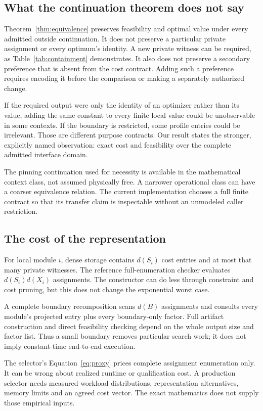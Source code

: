 \documentclass[11pt,letterpaper]{article}
\theoremstyle{definition}\newtheorem{definition}[theorem]{Definition}
\theoremstyle{remark}\newtheorem{remark}[theorem]{Remark}
\begin{document}
\subsection{What the continuation theorem does not say}
Theorem~\ref{thm:equivalence} preserves feasibility and optimal value under every admitted outside continuation. It does not preserve a particular private assignment or every optimum's identity. A new private witness can be required, as Table~\ref{tab:containment} demonstrates. It also does not preserve a secondary preference that is absent from the cost contract. Adding such a preference requires encoding it before the comparison or making a separately authorized change.

If the required output were only the identity of an optimizer rather than its value, adding the same constant to every finite local value could be unobservable in some contexts. If the boundary is restricted, some profile entries could be irrelevant. Those are different purpose contracts. Our result states the stronger, explicitly named observation: exact cost and feasibility over the complete admitted interface domain.

The pinning continuation used for necessity is available in the mathematical context class, not assumed physically free. A narrower operational class can have a coarser equivalence relation. The current implementation chooses a full finite contract so that its transfer claim is inspectable without an unmodeled caller restriction.

\subsection{The cost of the representation}
For local module $i$, dense storage contains $d(S_i)$ cost entries and at most that many private witnesses. The reference full-enumeration checker evaluates $d(S_i)d(X_i)$ assignments. The constructor can do less through constraint and cost pruning, but this does not change the exponential worst case.

A complete boundary recomposition scans $d(B)$ assignments and consults every module's projected entry plus every boundary-only factor. Full artifact construction and direct feasibility checking depend on the whole output size and factor list. Thus a small boundary removes particular search work; it does not imply constant-time end-to-end execution.

The selector's Equation~\eqref{eq:proxy} prices complete assignment enumeration only. It can be wrong about realized runtime or qualification cost. A production selector needs measured workload distributions, representation alternatives, memory limits and an agreed cost vector. The exact mathematics does not supply those empirical inputs.
\end{document}
